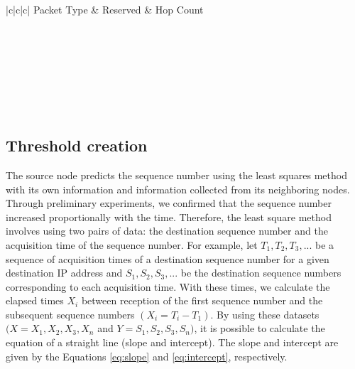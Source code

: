 \documentclass[conference]{IEEEtran}
\begin{document}
  \begin{table}[h]
  \begin{minipage}[t]{.45\textwidth}
    \begin{center}
        \caption{Modified RREP Specification}
        \label{tab:modRrep}
\begin{tabular}{|c|c|c|}
\hline
Packet Type & Reserved & Hop Count \\
\hline
{} \\
\hline
{} \\
\hline
{} \\
\hline
{} \\
\hline
{} \\
\hline
{} \\
\hline
{} \\
\hline
\end{tabular}
    \end{center}

  \end{minipage}
  \end{table}

\subsection{Threshold creation}
\label{thresholdCreation}
The source node predicts the sequence number using the least squares method with its own information and information collected from its neighboring nodes. Through preliminary experiments, we confirmed that the sequence number increased proportionally with the time. Therefore, the least square method involves using two pairs of data: the destination sequence number and the acquisition time of the sequence number. For example, let $T_1, T_2, T_3,...$ be a sequence of acquisition times of a destination sequence number for a given destination IP address and $S_1, S_2, S_3,...$ be the destination sequence numbers corresponding to each acquisition time. With these times, we calculate the elapsed times $X_i$ between reception of the first sequence number and the subsequent sequence numbers $(X_i = T_i - T_1)$. By using these datasets $(X = X_1, X_2, X_3, X_n$ and $Y = S_1, S_2, S_3, S_n)$, it is possible to calculate the equation of a straight line (slope and intercept). The slope and intercept are given by the Equations \ref{eq:slope} and \ref{eq:intercept}, respectively.
\end{document}
